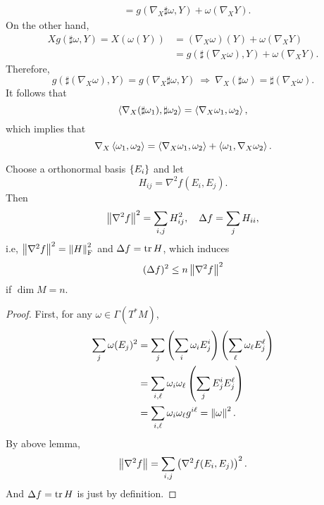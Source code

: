 \begin{rmk}
\begin{align*}
        &= g(\nabla_X \sharp \omega, Y) + \omega(\nabla_X Y).
    \end{align*}
    On the other hand,
    \begin{align*}
        Xg(\sharp \omega,Y) = X(\omega(Y)) &= (\nabla_X \omega)(Y) + \omega (\nabla_X Y) \\
        &= g(\sharp (\nabla_X \omega),Y) + \omega (\nabla_X Y).
    \end{align*}
    Therefore,
    \begin{equation*}
        g(\sharp (\nabla_X \omega),Y) = g(\nabla_X \sharp \omega, Y)~\Rightarrow~ \nabla_X(\sharp \omega) = \sharp (\nabla_X \omega).
    \end{equation*}
    It follows that
    \begin{equation*}
        \left\langle \nabla_X (\sharp \omega_1), \sharp \omega_2 \right\rangle = \left\langle \nabla_X \omega_1,\omega_2 \right\rangle,
    \end{equation*}
    which implies that
    \begin{equation*}
        \nabla_X \left\langle \omega_1,\omega_2 \right\rangle = \left\langle \nabla_X \omega_1,\omega_2 \right\rangle + \left\langle \omega_1, \nabla_X \omega_2 \right\rangle.
    \end{equation*}
\end{rmk}

\begin{lem}
    Choose a orthonormal basis $\left\{E_i\right\}$ and let
    \begin{equation*}
        H_{ij} = \nabla^2f(E_i,E_j).
    \end{equation*}
    Then
    \begin{equation*}
        \left\lVert\nabla^2 f\right\lVert^2 = \sum_{i,j}H_{ij}^2,\quad \Delta f = \sum_j H_{ii},
    \end{equation*}
    i.e, $\left\lVert\nabla^2 f\right\lVert^2 = \left\lVert H\right\lVert_{\operatorname{F}}^2$ and $\Delta f = \operatorname{tr} H$, which induces
    \begin{equation*}
        (\Delta f)^2 \leq n \left\lVert\nabla^2 f\right\lVert^2
    \end{equation*}
    if $\dim M = n$.
\end{lem}
\begin{proof}
    First, for any $\omega \in \Gamma(T^*M)$,
    \begin{align*}
        \sum_j \omega(E_j)^2 &= \sum_j \left(\sum_i \omega_i E^i_j\right)\left(\sum_\ell \omega_\ell E^\ell_j\right) \\
        &= \sum_{i,\ell}  \omega_i \omega_\ell \left(\sum_jE^i_jE^\ell_j\right) \\
        &= \sum_{i,\ell}  \omega_i \omega_\ell g^{i\ell} = \left\lVert\omega\right\lVert^2.
    \end{align*}
    By above lemma,
    \begin{equation*}
        \left\lVert\nabla^2 f\right\lVert = \sum_{i,j} \left(\nabla^2 f (E_i,E_j)\right)^2.
    \end{equation*}
    And $\Delta f = \operatorname{tr} H$ is just by definition.
\end{proof}

